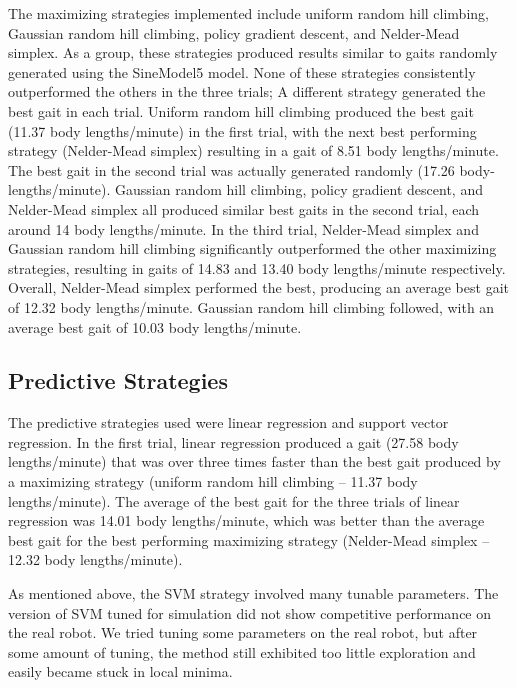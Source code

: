 The maximizing strategies implemented include uniform random hill
climbing, Gaussian random hill climbing, policy gradient descent, and
Nelder-Mead simplex. As a group, these strategies produced results
similar to gaits randomly generated using the SineModel5 model. None
of these strategies consistently outperformed the others in the three
trials; A different strategy generated the best gait in each
trial. Uniform random hill climbing produced the best gait (11.37 body
lengths/minute) in the first trial, with the next best performing
strategy (Nelder-Mead simplex) resulting in a gait of 8.51 body
lengths/minute. The best gait in the second trial was actually
generated randomly (17.26 body-lengths/minute). Gaussian random hill
climbing, policy gradient descent, and Nelder-Mead simplex all
produced similar best gaits in the second trial, each around 14 body
lengths/minute. In the third trial, Nelder-Mead simplex and Gaussian
random hill climbing significantly outperformed the other maximizing
strategies, resulting in gaits of 14.83 and 13.40 body lengths/minute
respectively. Overall, Nelder-Mead simplex performed the best,
producing an average best gait of 12.32 body lengths/minute. Gaussian
random hill climbing followed, with an average best gait of 10.03 body
lengths/minute.



\subsection{Predictive Strategies}

The predictive strategies used were linear regression and support
vector regression. In the first trial, linear regression produced a
gait (27.58 body lengths/minute) that was over three times faster than
the best gait produced by a maximizing strategy (uniform random hill
climbing -- 11.37 body lengths/minute). The average of the best gait
for the three trials of linear regression was 14.01 body
lengths/minute, which was better than the average best gait for the
best performing maximizing strategy (Nelder-Mead simplex -- 12.32 body
lengths/minute).

As mentioned above, the SVM strategy involved many tunable
parameters. The version of SVM tuned for simulation did not show
competitive performance on the real robot. We tried tuning some
parameters on the real robot, but after some amount of tuning, the
method still exhibited too little exploration and easily became stuck
in local minima.


